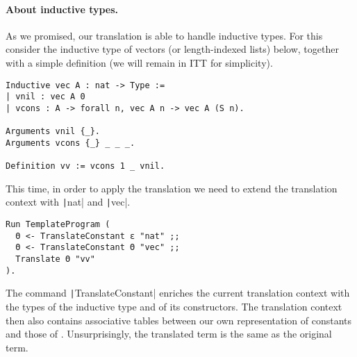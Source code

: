 \paragraph{About inductive types.}
%
As we promised, our translation is able to handle inductive types.
For this consider the inductive type of vectors (or length-indexed lists) below,
together with a simple definition (we will remain in \acrshort{ITT} for
simplicity).
%
\begin{verbatim}
Inductive vec A : nat -> Type :=
| vnil : vec A 0
| vcons : A -> forall n, vec A n -> vec A (S n).

Arguments vnil {_}.
Arguments vcons {_} _ _ _.

Definition vv := vcons 1 _ vnil.
\end{verbatim}
%
This time, in order to apply the translation we need to extend the translation
context with \texttt|nat| and \texttt|vec|.
%
\begin{verbatim}
Run TemplateProgram (
  Θ <- TranslateConstant ε "nat" ;;
  Θ <- TranslateConstant Θ "vec" ;;
  Translate Θ "vv"
).
\end{verbatim}
%
The command \texttt|TranslateConstant| enriches the current
translation context with the types of the inductive type and of its
constructors. The translation context then also contains associative
tables between our own representation of constants and those of \Coq.
Unsurprisingly, the translated \Coq term is the same as the original
term.

